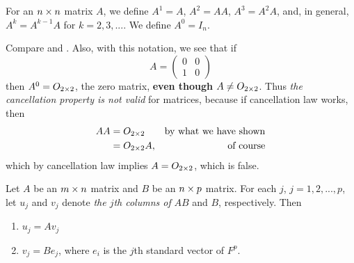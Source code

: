 \begin{additional definition} \label{adef 2.7}
For an \(n \times n\) matrix \(A\), we define \(A^1 = A\), \(A^2 = AA\), \(A^3 = A^2A\), and, in general, \(A^k = A^{k - 1} A\) for \(k = 2, 3, ...\).
We define \(A^0 = I_n\).
\end{additional definition}

\begin{remark} \label{remark 2.3.4}
Compare  and .
Also, with this notation, we see that if
\[
    A = \begin{pmatrix} 0 & 0 \\ 1 & 0 \end{pmatrix}
\]
then \(A^0 = O_{2 \times 2}\), the zero matrix, \textbf{even though} \(A \ne O_{2 \times 2}\).
Thus \emph{the cancellation property is not valid} for matrices, because if cancellation law works, then
\begin{align*}
    AA & = O_{2 \times 2} & \text{by what we have shown} \\
       & = O_{2 \times 2} A, & \text{of course}
\end{align*}
which by cancellation law implies \(A = O_{2 \times 2}\), which is false.
\end{remark} 

\begin{theorem} \label{thm 2.13}
Let \(A\) be an \(m \times n\) matrix and \(B\) be an \(n \times p\) matrix.
For each \(j\), \(j = 1, 2, ..., p\), let \(u_j\) and \(v_j\) denote \emph{the \(j\)th columns of} \(AB\) and \(B\), respectively.
Then
\begin{enumerate}
\item \(u_j = A v_j\)
\item \(v_j = B e_j\), where \(e_i\) is the \(j\)th standard vector of \(F^p\).
\end{enumerate}
\end{theorem}

